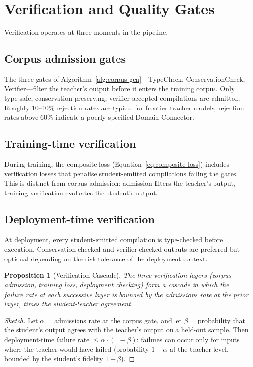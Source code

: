 \documentclass[twocolumn,11pt,a4paper]{article}
\newtheorem{proposition}[theorem]{Proposition}
\begin{document}
\section{Verification and Quality Gates}
\label{sec:verification}

Verification operates at three moments in the pipeline.

\subsection{Corpus admission gates}

The three gates of Algorithm~\ref{alg:corpus-gen}---TypeCheck, ConservationCheck, Verifier---filter the teacher's output before it enters the training corpus. Only type-safe, conservation-preserving, verifier-accepted compilations are admitted. Roughly 10--40\% rejection rates are typical for frontier teacher models; rejection rates above 60\% indicate a poorly-specified Domain Connector.

\subsection{Training-time verification}

During training, the composite loss (Equation~\ref{eq:composite-loss}) includes verification losses that penalise student-emitted compilations failing the gates. This is distinct from corpus admission: admission filters the teacher's output, training verification evaluates the student's output.

\subsection{Deployment-time verification}

At deployment, every student-emitted compilation is type-checked before execution. Conservation-checked and verifier-checked outputs are preferred but optional depending on the risk tolerance of the deployment context.

\begin{proposition}[Verification Cascade]
\label{prop:verification-cascade}
The three verification layers (corpus admission, training loss, deployment checking) form a cascade in which the failure rate at each successive layer is bounded by the admissions rate at the prior layer, times the student-teacher agreement.
\end{proposition}

\begin{proof}[Sketch]
Let $\alpha$ = admissions rate at the corpus gate, and let $\beta$ = probability that the student's output agrees with the teacher's output on a held-out sample. Then deployment-time failure rate $\leq \alpha \cdot (1 - \beta)$: failures can occur only for inputs where the teacher would have failed (probability $1 - \alpha$ at the teacher level, bounded by the student's fidelity $1 - \beta$).
\end{proof}
\end{document}
